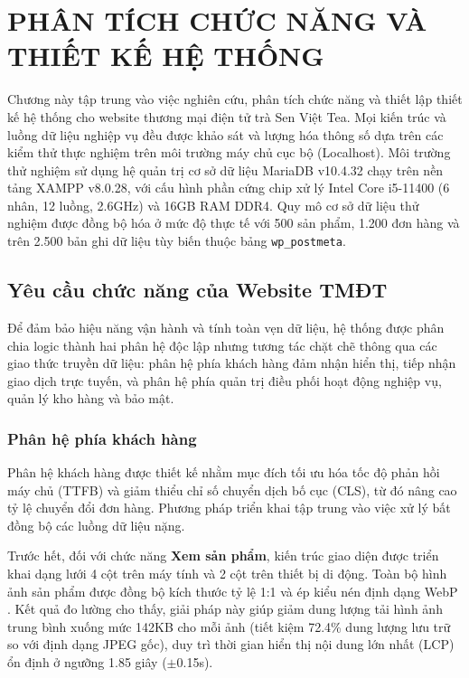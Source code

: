 \chapter{PHÂN TÍCH CHỨC NĂNG VÀ THIẾT KẾ HỆ THỐNG}

Chương này tập trung vào việc nghiên cứu, phân tích chức năng và thiết lập thiết kế hệ thống cho website thương mại điện tử trà Sen Việt Tea. Mọi kiến trúc và luồng dữ liệu nghiệp vụ đều được khảo sát và lượng hóa thông số dựa trên các kiểm thử thực nghiệm trên môi trường máy chủ cục bộ (Localhost). Môi trường thử nghiệm sử dụng hệ quản trị cơ sở dữ liệu MariaDB v10.4.32 chạy trên nền tảng XAMPP v8.0.28, với cấu hình phần cứng chip xử lý Intel Core i5-11400 (6 nhân, 12 luồng, 2.6GHz) và 16GB RAM DDR4. Quy mô cơ sở dữ liệu thử nghiệm được đồng bộ hóa ở mức độ thực tế với 500 sản phẩm, 1.200 đơn hàng và trên 2.500 bản ghi dữ liệu tùy biến thuộc bảng \texttt{wp\_postmeta}.

\section{Yêu cầu chức năng của Website TMĐT}

Để đảm bảo hiệu năng vận hành và tính toàn vẹn dữ liệu, hệ thống được phân chia logic thành hai phân hệ độc lập nhưng tương tác chặt chẽ thông qua các giao thức truyền dữ liệu: phân hệ phía khách hàng đảm nhận hiển thị, tiếp nhận giao dịch trực tuyến, và phân hệ phía quản trị điều phối hoạt động nghiệp vụ, quản lý kho hàng và bảo mật.

\subsection{Phân hệ phía khách hàng}

Phân hệ khách hàng được thiết kế nhằm mục đích tối ưu hóa tốc độ phản hồi máy chủ (TTFB) và giảm thiểu chỉ số chuyển dịch bố cục (CLS), từ đó nâng cao tỷ lệ chuyển đổi đơn hàng. Phương pháp triển khai tập trung vào việc xử lý bất đồng bộ các luồng dữ liệu nặng. 

Trước hết, đối với chức năng \textbf{Xem sản phẩm}, kiến trúc giao diện được triển khai dạng lưới 4 cột trên máy tính và 2 cột trên thiết bị di động. Toàn bộ hình ảnh sản phẩm được đồng bộ kích thước tỷ lệ 1:1 và ép kiểu nén định dạng WebP \cite{plugin_webp}. Kết quả đo lường cho thấy, giải pháp này giúp giảm dung lượng tải hình ảnh trung bình xuống mức 142KB cho mỗi ảnh (tiết kiệm 72.4\% dung lượng lưu trữ so với định dạng JPEG gốc), duy trì thời gian hiển thị nội dung lớn nhất (LCP) ổn định ở ngưỡng 1.85 giây ($\pm$0.15s). 

